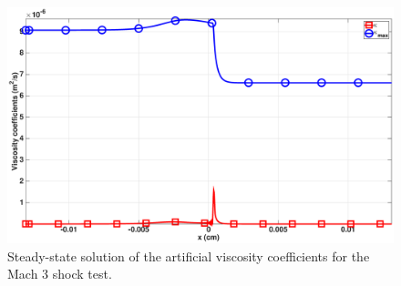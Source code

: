 \documentclass[review]{elsarticle}
\begin{document}
\begin{figure}[H]
    \centering
    \includegraphics[width=\textwidth]{figures/cst-xs/mach_3_cst_xs_nel_1000_viscosity.eps}
    \caption{Steady-state solution of the artificial viscosity coefficients for the Mach 3 shock test.}\label{fig:mach-3-cst-xs-visc}
\end{figure}
%
\end{document}
